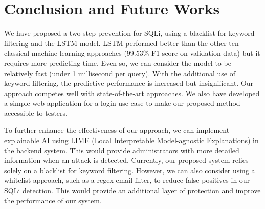 \section{Conclusion and Future Works}
\label{sec:conclusion}
\par We have proposed a two-step prevention for SQLi, using a blacklist for keyword filtering and the LSTM model. LSTM performed better than the other ten classical machine learning approaches (99.53\% F1 score on validation data) but it requires more predicting time. Even so, we can consider the model to be relatively fast (under 1 millisecond per query). With the additional use of keyword filtering, the predictive performance is increased but insignificant. Our approach competes well with state-of-the-art approaches. We also have developed a simple web application for a login use case to make our proposed method accessible to testers.

\par To further enhance the effectiveness of our approach, we can implement explainable AI using LIME (Local Interpretable Model-agnostic Explanations) in the backend system. This would provide administrators with more detailed information when an attack is detected. Currently, our proposed system relies solely on a blacklist for keyword filtering. However, we can also consider using a whitelist approach, such as a regex email filter, to reduce false positives in our SQLi detection. This would provide an additional layer of protection and improve the performance of our system.
